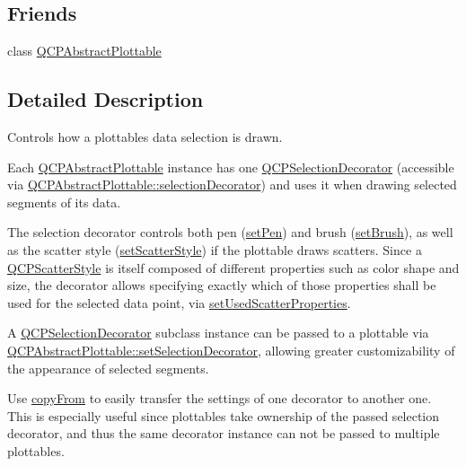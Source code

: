 \subsection*{Friends}
\begin{DoxyCompactItemize}
\item 
class \mbox{\hyperlink{class_q_c_p_selection_decorator_a53cf0e76aca814550c796fed79e345d6}{Q\+C\+P\+Abstract\+Plottable}}
\end{DoxyCompactItemize}


\subsection{Detailed Description}
Controls how a plottable\textquotesingle{}s data selection is drawn. 

Each \mbox{\hyperlink{class_q_c_p_abstract_plottable}{Q\+C\+P\+Abstract\+Plottable}} instance has one \mbox{\hyperlink{class_q_c_p_selection_decorator}{Q\+C\+P\+Selection\+Decorator}} (accessible via \mbox{\hyperlink{class_q_c_p_abstract_plottable_a7861518e47ca0c6a0c386032c2db075e}{Q\+C\+P\+Abstract\+Plottable\+::selection\+Decorator}}) and uses it when drawing selected segments of its data.

The selection decorator controls both pen (\mbox{\hyperlink{class_q_c_p_selection_decorator_ac2c8192e1e294aa3a4a7f32a859e3d76}{set\+Pen}}) and brush (\mbox{\hyperlink{class_q_c_p_selection_decorator_aa74b626be518ea17055f918d423c8c2d}{set\+Brush}}), as well as the scatter style (\mbox{\hyperlink{class_q_c_p_selection_decorator_ab403a613289714ff4fd4a0c0371ab116}{set\+Scatter\+Style}}) if the plottable draws scatters. Since a \mbox{\hyperlink{class_q_c_p_scatter_style}{Q\+C\+P\+Scatter\+Style}} is itself composed of different properties such as color shape and size, the decorator allows specifying exactly which of those properties shall be used for the selected data point, via \mbox{\hyperlink{class_q_c_p_selection_decorator_a808c1607cd4e83869c04986e332455c0}{set\+Used\+Scatter\+Properties}}.

A \mbox{\hyperlink{class_q_c_p_selection_decorator}{Q\+C\+P\+Selection\+Decorator}} subclass instance can be passed to a plottable via \mbox{\hyperlink{class_q_c_p_abstract_plottable_a20e266ad646f8c4a7e4631040510e5d9}{Q\+C\+P\+Abstract\+Plottable\+::set\+Selection\+Decorator}}, allowing greater customizability of the appearance of selected segments.

Use \mbox{\hyperlink{class_q_c_p_selection_decorator_a467a8d5cfcab27e862a17c797ac27b8a}{copy\+From}} to easily transfer the settings of one decorator to another one. This is especially useful since plottables take ownership of the passed selection decorator, and thus the same decorator instance can not be passed to multiple plottables.

